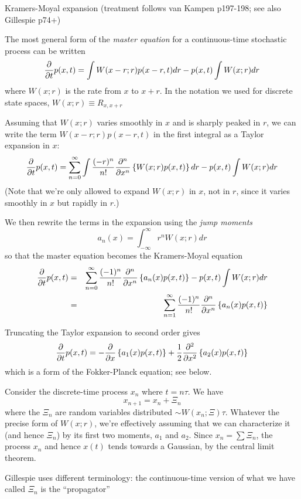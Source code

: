 \documentclass{beamer}
\begin{document}
\begin{frame}{}

\itemb
\item Kramers-Moyal expansion (treatment follows van Kampen p197-198; see also Gillespie p74+)
 \itemb
 \item The most general form of the {\em master equation} for a continuous-time stochastic process can be written
\[
\frac{\partial}{\partial {t}} p(x,t) = \int W(x-r;r) p(x-r,t) dr - p(x,t) \int W(x;r) dr
\]
where $W(x;r)$ is the rate from $x$ to $x+r$.
In the notation we used for discrete state spaces, $W(x;r) \equiv R_{x,x+r}$
 \item Assuming that $W(x;r)$ varies smoothly in $x$ and is sharply peaked in $r$,
we can write the term $W(x-r;r)p(x-r,t)$ in the first integral as a Taylor expansion in $x$:
\[
\frac{\partial}{\partial {t}} p(x,t) = \sum_{n=0}^\infty \int \frac{(-r)^n}{n!} \frac{\partial^{n}}{\partial {x}^{n}} \left\{ W(x;r) p(x,t) \right\} dr
 - p(x,t) \int W(x;r) dr
\]
(Note that we're only allowed to expand $W(x;r)$ in $x$, not in $r$, since it varies smoothly in $x$ but rapidly in $r$.)
 \item We then rewrite the terms in the expansion using the {\em jump moments}
\[
a_n(x) = \int_{-\infty}^\infty r^n W(x;r) dr
\]
so that the master equation becomes the Kramers-Moyal equation
\begin{eqnarray*}
\frac{\partial}{\partial {t}} p(x,t) & = & \sum_{n=0}^\infty \frac{(-1)^n}{n!} \frac{\partial^{n}}{\partial {x}^{n}} \left\{ a_n(x) p(x,t) \right\}
 - p(x,t) \int W(x;r) dr \\
& = & \sum_{n=1}^\infty \frac{(-1)^n}{n!} \frac{\partial^{n}}{\partial {x}^{n}} \left\{ a_n(x) p(x,t) \right\}
\end{eqnarray*}
 \item Truncating the Taylor expansion to second order gives
\[
\frac{\partial}{\partial {t}} p(x,t) = -\frac{\partial}{\partial {x}} \left\{ a_1(x) p(x,t) \right\} + \frac{1}{2} \frac{\partial^{2}}{\partial {x}^{2}} \left\{ a_2(x) p(x,t) \right\}
\]
which is a form of the Fokker-Planck equation; see below.
 \item Consider the discrete-time process $x_n$ where $t = n \tau$. We have
\[
x_{n+1} = x_n + \Xi_n
\]
where the $\Xi_n$ are random variables distributed $\sim W(x_n;\Xi) \tau$.
Whatever the precise form of $W(x;r)$, we're effectively assuming that we can characterize it
(and hence $\Xi_n$) by its first two moments, $a_1$ and $a_2$.
Since $x_n = \sum \Xi_n$, the process $x_n$ and hence $x(t)$ tends towards a Gaussian, by the central limit theorem.
 \item Gillespie uses different terminology:
the continuous-time version of what we have called $\Xi_n$ is the ``propagator''

\end{frame}
\end{document}
